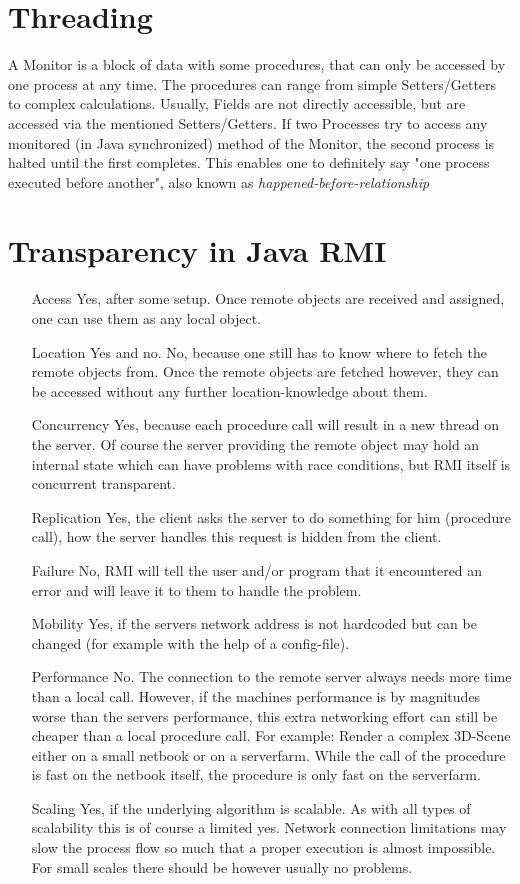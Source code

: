 \documentclass{tudexercise}
\begin{document}
	\section{Threading}
		A Monitor is a block of data with some procedures, that can only be accessed by one process at any time. The procedures can range from simple Setters/Getters to complex calculations. Usually, Fields are not directly accessible, but are accessed via the mentioned Setters/Getters.  
		If two Processes try to access any monitored (in Java synchronized) method of the Monitor, the second process is halted until the first completes. This enables one to definitely say "one process executed before another", also known as \textit{happened-before-relationship}
		
	\section{Transparency in Java RMI}
		\begin{itemize}
			\item[Access] Yes, after some setup. Once remote objects are received and assigned, one can use them as any local object.
			\item[Location] Yes and no. No, because one still has to know where to fetch the remote objects from. Once the remote objects are fetched however, they can be accessed without any further location-knowledge about them.
			\item[Concurrency] Yes, because each procedure call will result in a new thread on the server. Of course the server providing the remote object may hold an internal state which can have problems with race conditions, but RMI itself is concurrent transparent.
			\item[Replication] Yes, the client asks the server to do something for him (procedure call), how the server handles this request is hidden from the client. 
			\item[Failure] No, RMI will tell the user and/or program that it encountered an error and will leave it to them to handle the problem.
			\item[Mobility] Yes, if the servers network address is not hardcoded but can be changed (for example with the help of a config-file).
			\item[Performance] No. The connection to the remote server always needs more time than a local call. However, if the machines performance is by magnitudes worse than the servers performance, this extra networking effort can still be cheaper than a local procedure call. For example: Render a complex 3D-Scene either on a small netbook or on a serverfarm. While the call of the procedure is fast on the netbook itself, the procedure is only fast on the serverfarm.
			\item[Scaling] Yes, if the underlying algorithm is scalable. As with all types of scalability this is of course a limited yes. Network connection limitations may slow the process flow so much that a proper execution is almost impossible. For small scales there should be however usually no problems.
		\end{itemize}
		
\end{document}
